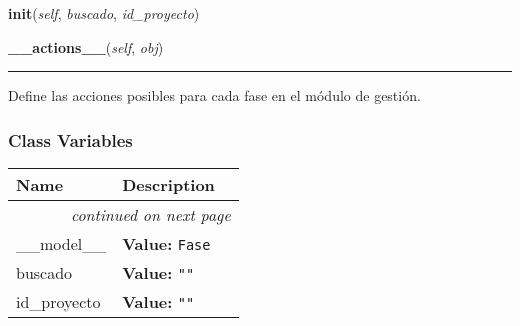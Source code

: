     \vspace{0.5ex}

\hspace{.8\funcindent}\begin{boxedminipage}{\funcwidth}

    \raggedright \textbf{init}(\textit{self}, \textit{buscado}, \textit{id\_proyecto})

\setlength{\parskip}{2ex}
\setlength{\parskip}{1ex}
    \end{boxedminipage}

    \label{saip:controllers:gestion_fase_controller:FaseTableFiller:__actions__}

    \vspace{0.5ex}

\hspace{.8\funcindent}\begin{boxedminipage}{\funcwidth}

    \raggedright \textbf{\_\_actions\_\_}(\textit{self}, \textit{obj})

    \vspace{-1.5ex}

    \rule{\textwidth}{0.5\fboxrule}
\setlength{\parskip}{2ex}
    Define las acciones posibles para cada fase en el módulo de gestión.

\setlength{\parskip}{1ex}
    \end{boxedminipage}



  \subsubsection{Class Variables}

    \vspace{-1cm}
\hspace{\varindent}\begin{longtable}{|p{\varnamewidth}|p{\vardescrwidth}|l}
\cline{1-2}
\cline{1-2} \centering \textbf{Name} & \centering \textbf{Description}& \\
\cline{1-2}
\endhead\cline{1-2}\multicolumn{3}{r}{\small\textit{continued on next page}}\\\endfoot\cline{1-2}
\endlastfoot\raggedright \_\-\_\-m\-o\-d\-e\-l\-\_\-\_\- & \raggedright \textbf{Value:} 
{\tt Fase}&\\
\cline{1-2}
\raggedright b\-u\-s\-c\-a\-d\-o\- & \raggedright \textbf{Value:} 
{\tt ""}&\\
\cline{1-2}
\raggedright i\-d\-\_\-p\-r\-o\-y\-e\-c\-t\-o\- & \raggedright \textbf{Value:} 
{\tt ""}&\\
\cline{1-2}
\end{longtable}

